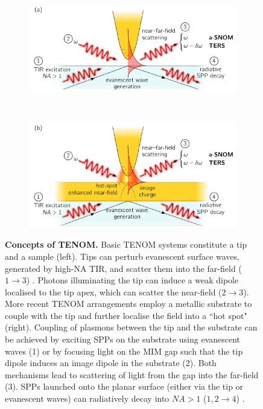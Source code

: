 \documentclass{article}
\begin{document}
\begin{figure}[bt]
\begin{singlespace}
\centering
\begin{subfigure}[t]{0.47\textwidth}
	\includegraphics{figures/tenom_basic}
\end{subfigure}
~
\begin{subfigure}[t]{0.47\textwidth}
	\includegraphics{figures/tenom_surface}
\end{subfigure}
\end{singlespace}
\caption[Concepts of TENOM]{\textbf{Concepts of TENOM.} Basic TENOM systems constitute a tip and a sample (left). Tips can perturb evanescent surface waves, generated by high-NA TIR, and scatter them into the far-field ($1\rightarrow3$) \cite{neacsu2005, mehtani2006}. Photons illuminating the tip can induce a weak dipole localised to the tip apex, which can scatter the near-field ($2\rightarrow3$). More recent TENOM arrangements employ a metallic substrate to couple with the tip and further localise the field into a ``hot spot" (right). Coupling of plasmons between the tip and the substrate can be achieved by exciting SPPs on the substrate using evanescent waves (1) or by focusing light on the MIM gap such that the tip dipole induces an image dipole in the substrate (2). Both mechanisms lead to scattering of light from the gap into the far-field (3). SPPs launched onto the planar surface (either via the tip or evanescent waves) can radiatively decay into $\mathit{NA}>1$ ($1,2\rightarrow4$) \cite{wang2011}.}
\label{fig:tenom_concept}
\end{figure}
\end{document}
